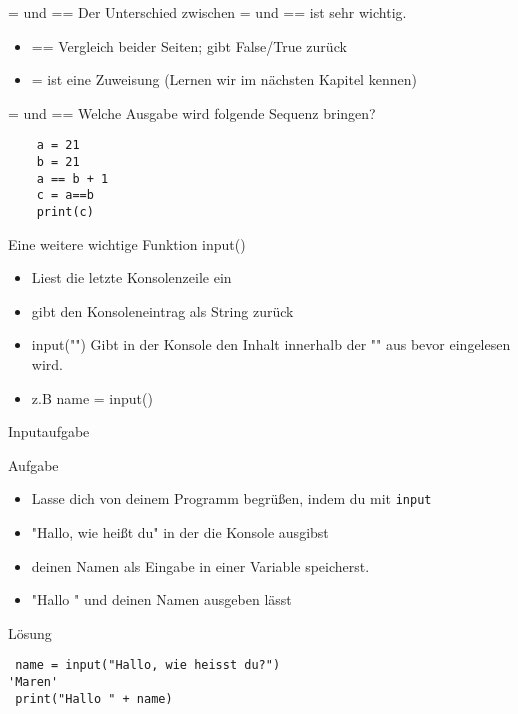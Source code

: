 \begin{frame}[fragile]{= und ==}
Der Unterschied zwischen = und == ist sehr wichtig.
\begin{itemize}
\item == Vergleich beider Seiten; gibt False/True zurück
\item = ist eine Zuweisung (Lernen wir im nächsten Kapitel kennen)
\end{itemize}
\end{frame}

\begin{frame}[fragile]{= und ==}
Welche Ausgabe wird folgende Sequenz bringen?
	\begin{lstlisting}
	a = 21
	b = 21
	a == b + 1
	c = a==b
	print(c)
	\end{lstlisting}
\end{frame}


\begin{frame}[fragile]{Eine weitere wichtige Funktion}
input()
\begin{itemize}
\item Liest die letzte Konsolenzeile ein
\item gibt den Konsoleneintrag als String zurück
\item input("") Gibt in der Konsole den Inhalt innerhalb der "" aus bevor eingelesen wird.
\item z.B name = input() 
\end{itemize}
\end{frame}

\begin{frame}[fragile]{Inputaufgabe}   
\begin{block}{Aufgabe}
\begin{itemize}
\item Lasse dich von deinem Programm begrüßen, indem du mit \texttt{input} 
\item "Hallo, wie heißt du" in der die Konsole ausgibst 
\item deinen Namen als  
Eingabe in einer Variable speicherst.
\item "Hallo " und deinen Namen ausgeben lässt
\end{itemize}
\end{block}
\begin{exampleblock}{Lösung}
\begin{lstlisting}
 name = input("Hallo, wie heisst du?")
'Maren'
 print("Hallo " + name)
\end{lstlisting}
\end{exampleblock}
\end{frame}

